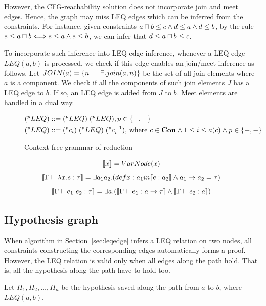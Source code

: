 However, the CFG-reachability solution does not incorporate join and meet
edges. Hence, the graph may miss LEQ edges which can be inferred from the
constraints. For instance,  given constraints $a\sqcap b \leq c\land d\leq a
\land d\leq b$, by the rule $e\leq a\sqcap b \Longleftrightarrow e\leq a\land e\leq b$, we can
infer that $d\leq a\sqcap b \leq c$. 

To incorporate such inference into LEQ edge inference, whenever a LEQ edge
$LEQ(a,b)$ is processed, we check if this edge enables an join/meet inference
as follows. Let $JOIN(a)=\{n \ \ | \ \  \exists. join(a,n) \}$ be the set of all join
elements where $a$ is a component. We check if all the components of such join
elements $J$ has a LEQ edge to $b$. If so, an LEQ edge is added from $J$ to
$b$. Meet elements are handled in a dual way.

\begin{figure}
\hfil
\begin{minipage}{2.3in}
\begin{align*}
(^{p}LEQ) ::=\; & (^{p}LEQ)\; (^{p}LEQ), p\in \{+,-\} \\
(^{p}LEQ) ::=\; & (^{p}c_i)\; (^{p}LEQ)\; (^{p}c_i^{-1}) \text{, where }  
    c\in \mathbf{Con} \land 1 \leq i\leq a(c) \land p\in \{+,-\}\\
\end{align*}
\end{minipage}
\caption{Context-free grammar of reduction}
\label{figure:cfg}
\end{figure}

\[\llbracket x \rrbracket = VarNode(x)\]
\[\llbracket \Gamma \vdash \lambda x.e:\tau \rrbracket = \exists a_1 a_2.
(def x: a_1 in \llbracket e:a_2 \rrbracket \land a_1 \rightarrow a_2 =\tau)\]
\[\llbracket \Gamma\vdash e_1~e_2 : \tau \rrbracket = \exists a.(\llbracket \Gamma \vdash
e_1:a\rightarrow \tau \rrbracket\land \llbracket \Gamma\vdash e_2:a \rrbracket)\]

\subsection{Hypothesis graph}
\label{sec:hypograph}

When algorithm in Section~\ref{sec:leqedge} infers a LEQ relation on two nodes,
all constraints constructing the corresponding edges automatically forms a
proof. However, the LEQ relation is valid only when all edges along the path
hold. That is, all the hypothesis along the path have to hold too.

Let $H_1, H_2, \dots, H_n$ be the hypothesis saved along the path from $a$ to
$b$, where $LEQ(a,b)$. 

